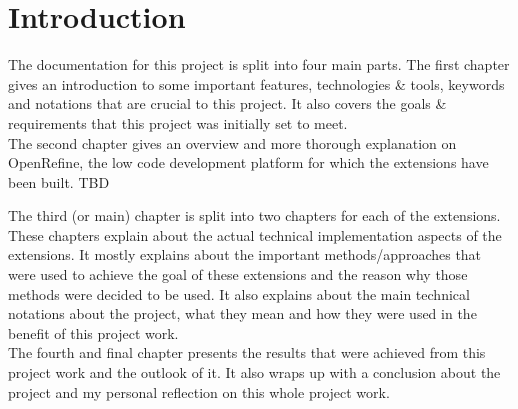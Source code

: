 \chapter{Introduction}\label{ch:introduction}
The documentation for this project is split into four main parts.
The first chapter gives an introduction to some important features, technologies \& tools, keywords and notations that are crucial to this project.
It also covers the goals \& requirements that this project was initially set to meet.\\
\newline
The second chapter gives an overview and more thorough explanation on OpenRefine, the low code development platform for which the extensions have been built. TBD\\
\newline

The third (or main) chapter is split into two chapters for each of the extensions. These chapters explain about the actual technical implementation aspects of the extensions.
It mostly explains about the important methods/approaches that were used to achieve the goal of these extensions and the reason why those methods were decided to be used.
It also explains about the main technical notations about the project, what they mean and how they were used in the benefit of this project work.\\
\newline
The fourth and final chapter presents the results that were achieved from this project work and the outlook of it.
It also wraps up with a conclusion about the project and my personal reflection on this whole project work.
\pagebreak
